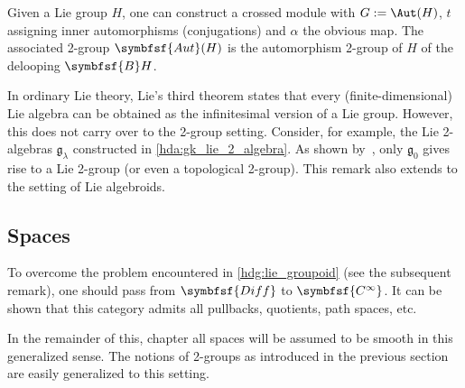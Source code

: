     \begin{example}
        Given a Lie group $H$, one can construct a crossed module with $G:=\Aut(H)$, $t$ assigning inner automorphisms (conjugations) and $\alpha$ the obvious map. The associated 2-group $\symbfsf{Aut}(H)$ is the automorphism 2-group of $H$ of the delooping $\symbfsf{B}H$.
    \end{example}


    \begin{remark}
        In ordinary Lie theory, Lie's third theorem states that every (finite-dimensional) Lie algebra can be obtained as the infinitesimal version of a Lie group. However, this does not carry over to the 2-group setting. Consider, for example, the Lie 2-algebras $\mathfrak{g}_\lambda$ constructed in \cref{hda:gk_lie_2_algebra}. As shown by~\citet{baez_higher-dimensional_2003-1}, only $\mathfrak{g}_0$ gives rise to a Lie 2-group (or even a topological 2-group). This remark also extends to the setting of Lie algebroids.
    \end{remark}

\subsection{Spaces}

    To overcome the problem encountered in \cref{hdg:lie_groupoid} (see the subsequent remark), one should pass from $\symbfsf{Diff}$ to $\symbfsf{C^\infty}$. It can be shown that this category admits all pullbacks, quotients, path spaces, etc.


    In the remainder of this, chapter all spaces will be assumed to be smooth in this generalized sense. The notions of 2-groups as introduced in the previous section are easily generalized to this setting.

